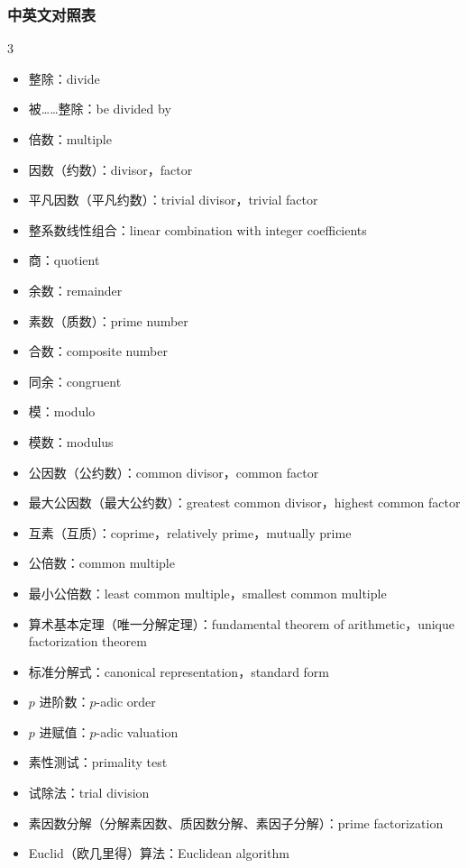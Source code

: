 \documentclass{../pkslide}
\begin{document}
\begin{frame}[c]
  \frametitle{中英文对照表}
  \tiny
  
  \begin{adjustwidth}{-.5cm}{}
    \begin{mymulticols}[l][l]{3}
      \begin{itemize}
        \item 整除：divide
        \item 被……整除：be divided by
        \item 倍数：multiple
        \item 因数（约数）：divisor，factor
        \item 平凡因数（平凡约数）：trivial divisor，trivial factor
        \item 整系数线性组合：linear combination with integer coefficients
        \item 商：quotient
        \item 余数：remainder
        \item 素数（质数）：prime number
        \item 合数：composite number
        \item 同余：congruent
        \item 模：modulo
        \item 模数：modulus
        \item 公因数（公约数）：common divisor，common factor
        \item 最大公因数（最大公约数）：greatest common divisor，highest common factor
        \item 互素（互质）：coprime，relatively prime，mutually prime
        \item 公倍数：common multiple
        \item 最小公倍数：least common multiple，smallest common multiple
        \item 算术基本定理（唯一分解定理）：fundamental theorem of arithmetic，unique factorization theorem
        \item 标准分解式：canonical representation，standard form
        \item $p$ 进阶数：$p$-adic order
        \item $p$ 进赋值：$p$-adic valuation
        \item 素性测试：primality test
        \item 试除法：trial division
        \item 素因数分解（分解素因数、质因数分解、素因子分解）：prime factorization
        \item Euclid（欧几里得）算法：Euclidean algorithm

\end{itemize}
\end{mymulticols}
\end{adjustwidth}
\end{frame}
\end{document}
